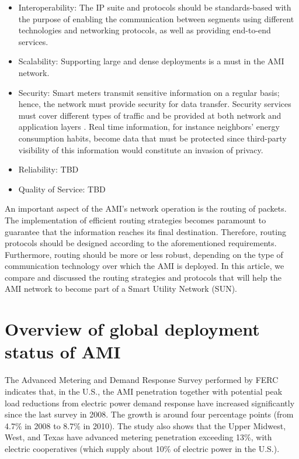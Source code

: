 \documentclass[11pt,draftclsnofoot,onecolumn]{IEEEtran}
\begin{document}
\begin{itemize}
\item Interoperability: The IP suite and protocols should be standards-based with the purpose of enabling the communication between segments using different technologies and networking protocols, as well as providing end-to-end services.
\item Scalability: Supporting large and dense deployments is a must in the AMI network. 
\item Security: Smart meters transmit sensitive information on a regular basis; hence, the network must provide security for data transfer. Security services must cover different types of traffic and be provided at both network and application layers \cite{Bennett2008}. Real time information, for instance neighbors' energy consumption habits, become data that must be protected since third-party visibility of this information would constitute an invasion of privacy.
\item{Reliability: TBD}
\item{Quality of Service: TBD}
\end{itemize}

An important aspect of the AMI's network operation is the routing of packets. The implementation of efficient routing strategies becomes paramount to guarantee that the information reaches its final destination. Therefore, routing protocols should be designed according to the aforementioned requirements. Furthermore, routing should be more or less robust, depending on the type of communication technology over which the AMI is deployed. In this article, we compare and discussed the routing strategies and protocols that will help the AMI network to become part of a Smart Utility Network (SUN).

\section{Overview of global deployment status of AMI}\label{ami}

The Advanced Metering and Demand Response Survey performed by FERC \cite{FERC2012} indicates that, in the U.S., the AMI penetration together with potential peak load reductions from electric power demand response have increased significantly since the last survey in 2008. The growth is around four percentage points (from 4.7\% in 2008 to 8.7\% in 2010). The study also shows that the Upper Midwest, West, and Texas have advanced metering penetration exceeding 13\%, with electric cooperatives (which supply about 10\% of electric power in the U.S.). 
\end{document}
